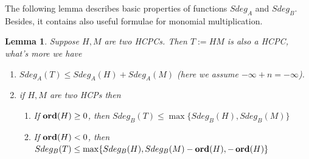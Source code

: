 \documentclass[11pt]{article}
\theoremstyle{definition}
\newcommand{\Ord}{\mathop {\rm \bf ord}}
\theoremstyle{plain}
\newtheorem{lemma}{Lemma}[section]
\numberwithin{equation}{section}
\begin{document}
The following lemma describes basic properties of functions $Sdeg_A$ and $Sdeg_B$. Besides, it contains also useful formulae for monomial multiplication. 

\begin{lemma}
	\label{L:HCPC}
	Suppose $H,M$ are two  HCPCs. Then $T:=HM$ is also a HCPC, what's more we have 
	\begin{enumerate}
		\item $Sdeg_A(T)\leq Sdeg_A(H)+Sdeg_A(M)$ (here we assume $-\infty +n=-\infty$). 
		\item 
		if $H,M$ are two  HCPs then
		\begin{enumerate}
			\item If $\Ord(H)\geq 0$, then $Sdeg_B(T)\leq \max \{Sdeg_B(H),Sdeg_B(M)\}$
			\item If $\Ord(H)< 0$, then $Sdeg_B(T)\leq \max \{Sdeg_B(H),Sdeg_B(M)-\Ord(H),-\Ord(H)\}$
		\end{enumerate}
	\end{enumerate}
\end{lemma}
\end{document}
